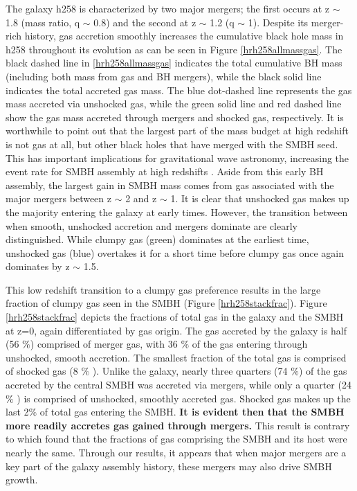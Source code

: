 \documentclass[]{emulateapj}
\begin{document}

The galaxy h258 is characterized by two major mergers; the first occurs at z $\sim$ 1.8 (mass ratio, q $\sim$ 0.8) and the second at z $\sim$ 1.2 (q $\sim$ 1). Despite its merger-rich history, gas accretion smoothly increases the cumulative black hole mass in h258 throughout its evolution as can be seen in Figure \ref{hrh258allmassgas}. The black dashed line in \ref{hrh258allmassgas} indicates the total cumulative BH mass (including both mass from gas and BH mergers), while the black solid line indicates the total accreted gas mass. The blue dot-dashed line represents the gas mass accreted via unshocked gas, while the green solid line and red dashed line show the gas mass accreted through mergers and shocked gas, respectively. It is worthwhile to point out that the largest part of the mass budget at high redshift is not gas at all, but other black holes that have merged with the SMBH seed. This has important implications for gravitational wave astronomy, increasing the event rate for SMBH assembly at high redshifts \citep{Holley-Bockelmann2010}. Aside from this early BH assembly, the largest gain in SMBH mass comes from gas associated with the major mergers between z $\sim$ 2 and z $\sim$ 1. It is clear that unshocked gas makes up the majority entering the galaxy at early times. However, the transition between when smooth, unshocked accretion and mergers dominate are clearly distinguished. While clumpy gas (green) dominates at the earliest time, unshocked gas (blue) overtakes it for a short time before clumpy gas once again dominates by z $\sim$ 1.5. 

This low redshift transition to a clumpy gas preference results in the large fraction of clumpy gas seen in the SMBH (Figure \ref{hrh258stackfrac}). Figure \ref{hrh258stackfrac} depicts the fractions of total gas in the galaxy and the SMBH at z=0, again differentiated by gas origin. The gas accreted by the galaxy is half (56 $\%$) comprised of merger gas, with 36 $\%$ of the gas entering through unshocked, smooth accretion. The smallest fraction of the total gas is comprised of shocked gas (8 $\%$ ). Unlike the galaxy, nearly three quarters (74 $\%$) of the gas accreted by the central SMBH was accreted via mergers, while only a quarter (24 $\%$ ) is comprised of unshocked, smoothly accreted gas. Shocked gas makes up the last 2$\%$ of total gas entering the SMBH. \textbf{It is evident then that the SMBH more readily accretes gas gained through mergers.} This result is contrary to \cite{Bellovary2013} which found that the fractions of gas comprising the SMBH and its host were nearly the same. Through our results, it appears that when major mergers are a key part of the galaxy assembly history, these mergers may also drive SMBH growth.
\end{document}
